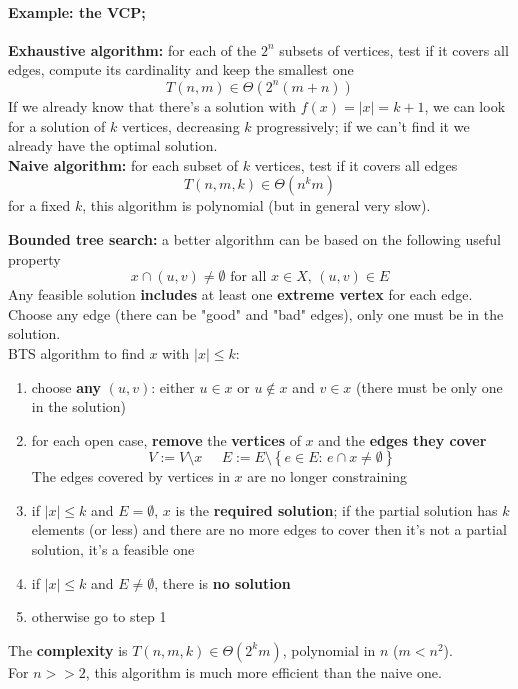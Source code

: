 \paragraph{Example: the VCP;} \textbf{Exhaustive algorithm:} for each of the $2^n$ subsets of vertices, test if it covers all edges, compute its cardinality and keep the smallest one
$$ T(n,m) \in \Theta \left(2^n (m+n)\right) $$
If we already know that there's a solution with $f(x) = |x| = k+1$, we can look for a solution of $k$ vertices, decreasing $k$ progressively; if we can't find it we already have the optimal solution.\\

\textbf{Naive algorithm:} for each subset of $k$ vertices, test if it covers all edges
$$ T(n,m,k) \in \Theta \left(n^k m\right) $$
for a fixed $k$, this algorithm is polynomial (but in general very slow).\\

\newpage

\textbf{Bounded tree search:} a better algorithm can be based on the following useful property
$$ x \cap (u,v) \neq \emptyset \text{ for all } x \in X, \, (u,v) \in E $$
Any feasible solution \textbf{includes} at least one \textbf{extreme vertex} for each edge.\\
Choose any edge (there can be "good" and "bad" edges), only one must be in the solution.\\

BTS algorithm to find $x$ with $|x| \leq k$:
\begin{enumerate}
	\item choose \textbf{any} $(u,v)$: either $u \in x$ or $u \notin x$ and $v \in x$ (there must be only one in the solution)
	\item for each open case, \textbf{remove} the \textbf{vertices} of $x$ and the \textbf{edges they cover}
	$$ V := V \setminus x \;\;\;\;\; E := E \setminus \left\{e \in E: \, e \cap x \neq \emptyset \right\}$$
	The edges covered by vertices in $x$ are no longer constraining
	\item if $|x| \leq k$ and $E = \emptyset$, $x$ is the \textbf{required solution}; if the partial solution has $k$ elements (or less) and there are no more edges to cover then it's not a partial solution, it's a feasible one
	\item if $|x| \leq k$ and $E \neq \emptyset$, there is \textbf{no solution}
	\item otherwise go to step 1
\end{enumerate}
The \textbf{complexity} is $T(n,m,k) \in \Theta(2^k m)$, polynomial in $n$ ($m < n^2$). \\
For $n>>2$, this algorithm is much more efficient than the naive one.\\


